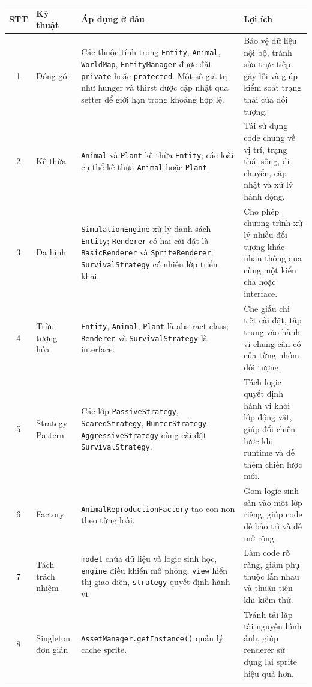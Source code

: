 \documentclass[12pt,a4paper]{article}
\begin{document}
\begin{longtable}{|c|p{3.2cm}|p{5cm}|p{5cm}|}
    \hline
    \textbf{STT} & \textbf{Kỹ thuật} & \textbf{Áp dụng ở đâu} & \textbf{Lợi ích} \\
    \hline
    1 & Đóng gói & Các thuộc tính trong \texttt{Entity}, \texttt{Animal}, \texttt{WorldMap}, \texttt{EntityManager} được đặt \texttt{private} hoặc \texttt{protected}. Một số giá trị như hunger và thirst được cập nhật qua setter để giới hạn trong khoảng hợp lệ. & Bảo vệ dữ liệu nội bộ, tránh sửa trực tiếp gây lỗi và giúp kiểm soát trạng thái của đối tượng. \\
    \hline
    2 & Kế thừa & \texttt{Animal} và \texttt{Plant} kế thừa \texttt{Entity}; các loài cụ thể kế thừa \texttt{Animal} hoặc \texttt{Plant}. & Tái sử dụng code chung về vị trí, trạng thái sống, di chuyển, cập nhật và xử lý hành động. \\
    \hline
    3 & Đa hình & \texttt{SimulationEngine} xử lý danh sách \texttt{Entity}; \texttt{Renderer} có hai cài đặt là \texttt{BasicRenderer} và \texttt{SpriteRenderer}; \texttt{SurvivalStrategy} có nhiều lớp triển khai. & Cho phép chương trình xử lý nhiều đối tượng khác nhau thông qua cùng một kiểu cha hoặc interface. \\
    \hline
    4 & Trừu tượng hóa & \texttt{Entity}, \texttt{Animal}, \texttt{Plant} là abstract class; \texttt{Renderer} và \texttt{SurvivalStrategy} là interface. & Che giấu chi tiết cài đặt, tập trung vào hành vi chung cần có của từng nhóm đối tượng. \\
    \hline
    5 & Strategy Pattern & Các lớp \texttt{PassiveStrategy}, \texttt{ScaredStrategy}, \texttt{HunterStrategy}, \texttt{AggressiveStrategy} cùng cài đặt \texttt{SurvivalStrategy}. & Tách logic quyết định hành vi khỏi lớp động vật, giúp đổi chiến lược khi runtime và dễ thêm chiến lược mới. \\
    \hline
    6 & Factory & \texttt{AnimalReproductionFactory} tạo con non theo từng loài. & Gom logic sinh sản vào một lớp riêng, giúp code dễ bảo trì và dễ mở rộng. \\
    \hline
    7 & Tách trách nhiệm & \texttt{model} chứa dữ liệu và logic sinh học, \texttt{engine} điều khiển mô phỏng, \texttt{view} hiển thị giao diện, \texttt{strategy} quyết định hành vi. & Làm code rõ ràng, giảm phụ thuộc lẫn nhau và thuận tiện khi kiểm thử. \\
    \hline
    8 & Singleton đơn giản & \texttt{AssetManager.getInstance()} quản lý cache sprite. & Tránh tải lặp tài nguyên hình ảnh, giúp renderer sử dụng lại sprite hiệu quả hơn. \\
    \hline
\end{longtable}
\end{document}
